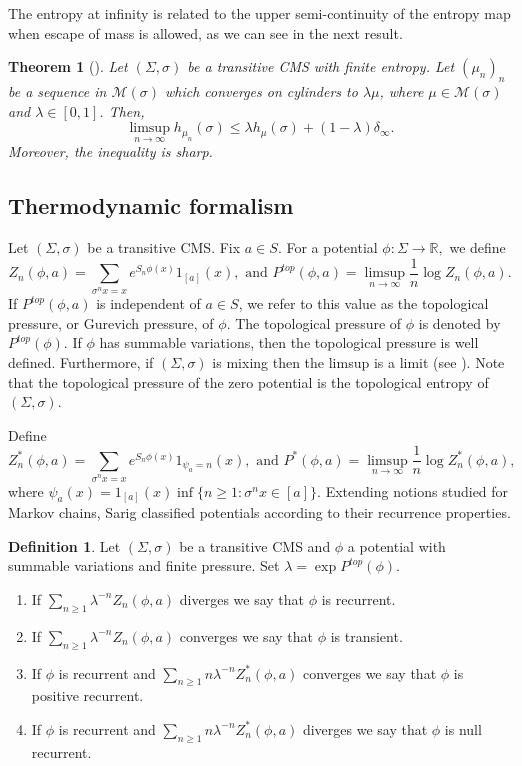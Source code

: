 \documentclass[letterpaper,11pt]{amsart}
\theoremstyle{plain}
\newtheorem{theorem}{Theorem}[section]
\theoremstyle{plain}
\theoremstyle{definition}
\newtheorem{definition}{Definition}[subsection]
\theoremstyle{remark}
\def\R{{\mathbb R}}
\def\M{{\mathcal M}}
\begin{document}
The entropy at infinity is related to the upper semi-continuity of the entropy map when escape of mass is allowed, as we can see in the next result. 

\begin{theorem}[{\cite[Theorem 1.1]{itv}}] \label{itv} Let $(\Sigma,\sigma)$ be a transitive CMS with finite entropy.  Let $(\mu_n)_{n}$ be a sequence in $\M(\sigma)$ which converges on cylinders to $\lambda \mu$, where $\mu\in \M(\sigma)$ and $\lambda\in [0,1]$. Then, $$\limsup_{n\to \infty} h_{\mu_n}(\sigma)\le \lambda h_{\mu}(\sigma)+(1-\lambda)\delta_\infty.$$
Moreover, the inequality is sharp.
\end{theorem}




\subsection{Thermodynamic formalism}\label{introcms} Let $(\Sigma,\sigma)$ be a transitive CMS. Fix $a\in S$. 
For a potential $\phi:\Sigma\to \R,$ we define $$Z_n(\phi,a)=\sum_{\sigma^n x=x} e^{S_n \phi(x)}1_{[a]}(x), \text{ and } P^{top}(\phi,a)=\limsup_{n\to \infty} \frac{1}{n}\log Z_n(\phi,a).$$
If $P^{top}(\phi, a)$ is independent of $a \in S$, we refer to this value as the topological pressure, or Gurevich pressure, of $\phi$. The topological pressure of $\phi$ is denoted by $P^{top}(\phi)$. If $\phi$ has summable variations, then the topological pressure is well defined. Furthermore, if $(\Sigma,\sigma)$ is  mixing then the limsup is a limit (see \cite[Theorem 1]{sa1}). Note that the topological pressure of the zero potential is the topological entropy of $(\Sigma,\sigma)$.

Define
 $$Z_n^*(\phi,a)=\sum_{\sigma^nx=x} e^{S_n\phi(x)}1_{\psi_a=n}(x),\text{ and } P^*(\phi,a)=\limsup_{n\to\infty}\frac{1}{n}\log Z_n^*(\phi,a),$$ where $\psi_a(x)=1_{[a]}(x)\inf\{n\ge1:\sigma^n x\in [a]\}$. Extending notions studied for Markov chains, Sarig \cite{sa1} classified potentials according to their recurrence properties.
\begin{definition} Let $(\Sigma,\sigma)$ be a transitive CMS and $\phi$ a  potential with summable variations and finite pressure. Set $\lambda=\exp P^{top}(\phi)$.
\begin{enumerate}
\item If $\sum_{n\ge 1}\lambda^{-n}Z_n(\phi,a)$ diverges we say that $\phi$ is {recurrent}.
\item If $\sum_{n\ge 1}\lambda^{-n}Z_n(\phi,a)$ converges we say that $\phi$ is {transient}.
\item If $\phi$ is recurrent and $\sum_{n\ge 1}n\lambda^{-n}Z^*_n(\phi,a)$ converges we say that $\phi$ is {positive recurrent}.
\item If $\phi$ is recurrent and $\sum_{n\ge 1}n\lambda^{-n}Z^*_n(\phi,a)$ diverges we say that $\phi$ is {null recurrent}.
\end{enumerate}
\end{definition}
\end{document}
